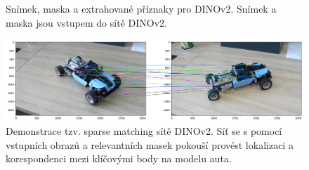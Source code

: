 \begin{figure}[H]
\centering

\newcommand{\subfiguresize}{.15\textwidth}
\newcommand{\imagewidth}{1.0in}
\newcommand{\hspacesize}{.00in}

\newcommand{\insertimage}[1]{%
  \begin{minipage}{\imagewidth}
    \centering
    \texttt{[image: \#1]}
  \end{minipage}
}

\hspace{\hspacesize}%
\hspace{\hspacesize}%
\caption[Snímek, maska a extrahované příznaky pro DINOv2]
{Snímek, maska a extrahované příznaky pro DINOv2. Snímek a maska jsou vstupem do sítě DINOv2. }
\label{fig:dinov2_masks}
\end{figure}

\begin{figure}[H]
\centering
\includegraphics[width=1.0\textwidth,keepaspectratio]{Figures/dinov2demo.png}
\caption[Demonstrace tzv. sparse matching sítě DINOv2]{Demonstrace tzv. sparse matching sítě DINOv2. Síť se s pomocí vstupních obrazů a relevantních masek pokouší provést lokalizaci a korespondenci mezi klíčovými body na modelu auta.}
\label{fig:dinov2_sparse_car_lego}
\end{figure}

